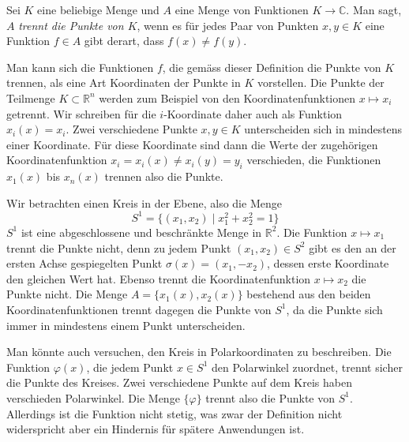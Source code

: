 \begin{definition}
Sei $K$ eine beliebige Menge und $A$ eine Menge von Funktionen
$K\to \mathbb{C}$.
Man sagt, $A$ {\em trennt die Punkte von $K$}, wenn es für jedes Paar
%
von Punkten $x,y\in K$ eine Funktion $f\in A$ gibt derart, dass
$f(x)\ne f(y)$.
\end{definition}

Man kann sich die Funktionen $f$, die gemäss dieser Definition die Punkte
von $K$ trennen, als eine Art Koordinaten der Punkte in $K$ vorstellen.
Die Punkte der Teilmenge $K\subset \mathbb{R}^n$ werden zum Beispiel
von den Koordinatenfunktionen $x\mapsto x_i$ getrennt.
Wir schreiben für die $i$-Koordinate daher auch als Funktion $x_i(x)=x_i$.
Zwei verschiedene Punkte $x,y\in K$ unterscheiden sich in mindestens
einer Koordinate.
Für diese Koordinate sind dann die Werte der zugehörigen
Koordinatenfunktion $x_i=x_i(x)\ne x_i(y)=y_i$ verschieden, die
Funktionen $x_1(x)$ bis $x_n(x)$ trennen also die Punkte.

\begin{beispiel}
Wir betrachten einen Kreis in der Ebene, also die Menge
\[
S^1
=
\{(x_1,x_2) \mid x_1^2 + x_2^2=1\}
\]
$S^1$ ist eine abgeschlossene und beschränkte Menge in $\mathbb{R}^2$.
Die Funktion $x\mapsto x_1$ trennt die Punkte nicht, denn zu jedem
Punkt $(x_1,x_2)\in S^2$ gibt es den an der ersten Achse
gespiegelten Punkt $\sigma(x)=(x_1,-x_2)$, dessen erste Koordinate
den gleichen Wert hat.
Ebenso trennt die Koordinatenfunktion $x\mapsto x_2$ die Punkte nicht.
Die Menge $A=\{ x_1(x), x_2(x)\}$ bestehend aus den beiden
Koordinatenfunktionen trennt dagegen die Punkte von $S^1$, da die Punkte
sich immer in mindestens einem Punkt unterscheiden.

Man könnte auch versuchen, den Kreis in Polarkoordinaten zu beschreiben.
Die Funktion $\varphi(x)$, die jedem Punkt $x\in S^1$ den Polarwinkel
zuordnet, trennt sicher die Punkte des Kreises.
Zwei verschiedene Punkte auf dem Kreis haben verschieden Polarwinkel.
Die Menge $\{\varphi\}$ trennt also die Punkte von $S^1$.
Allerdings ist die Funktion nicht stetig, was zwar der Definition
nicht widerspricht aber ein Hindernis für spätere Anwendungen ist.
\end{beispiel}


